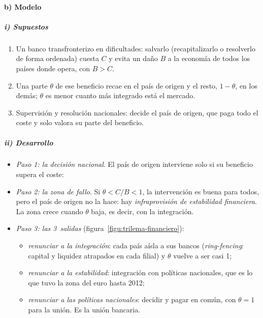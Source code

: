 \documentclass[11pt]{article}
\begin{document}
\paragraph{b) Modelo}

\subparagraph{i) Supuestos}

\begin{enumerate}
\item Un banco transfronterizo en dificultades: salvarlo (recapitalizarlo o resolverlo de forma ordenada) cuesta $C$ y evita un daño $B$ a la economía de todos los países donde opera, con $B>C$.
\item Una parte $\theta$ de ese beneficio recae en el país de origen y el resto, $1-\theta$, en los demás; $\theta$ es menor cuanto más integrado está el mercado.
\item Supervisión y resolución nacionales: decide el país de origen, que paga todo el coste y solo valora su parte del beneficio.
\end{enumerate}

\subparagraph{ii) Desarrollo}

\begin{itemize}
\item \emph{Paso 1: la decisión nacional}. El país de origen interviene solo si su beneficio supera el coste:
\item \emph{Paso 2: la zona de fallo}. Si $\theta<C/B<1$, la intervención es buena para todos, pero el país de origen no la hace: hay \emph{infraprovisión de estabilidad financiera}. La zona crece cuando $\theta$ baja, es decir, con la integración.
\item \emph{Paso 3: las 3~salidas} (figura~\ref{figu:trilema-financiero}):
  \begin{itemize}
  \item \emph{renunciar a la integración}: cada país aísla a sus bancos (\emph{ring-fencing}: capital y liquidez atrapados en cada filial) y $\theta$ vuelve a ser casi 1;
  \item \emph{renunciar a la estabilidad}: integración con políticas nacionales, que es lo que tuvo la zona del euro hasta 2012;
  \item \emph{renunciar a las políticas nacionales}: decidir y pagar en común, con $\theta=1$ para la unión. Es la unión bancaria.
  \end{itemize}
\end{itemize}
\end{document}
